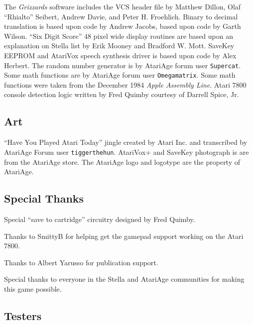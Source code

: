 \documentclass[9pt,twocolumn,openany,article]{memoir}
\begin{document}
{ \footnotesize The \textit{Grizzards} software includes the VCS header file by
  Matthew Dillon, Olaf  ``Rhialto'' Seibert, Andrew Davie,  and Peter H.
  Froehlich. Binary to decimal translation  is based upon code by Andrew
  Jacobs, based upon code by Garth  Wilson. ``Six Digit Score'' 48 pixel
  wide display routines are based upon  an explanation on Stella list by
  Erik Mooney and Bradford W. Mott. \ifdefined\ATARIAGESAVE\else SaveKey
  EEPROM and \fi{}  AtariVox speech synthesis driver is  based upon code
  by Alex Herbert. The random number generator is by AtariAge forum user
  \texttt{Supercat}.  Some math  functions  are by  AtariAge forum  user
  \texttt{Omega\-matrix}.  Some  math  functions  were  taken  from  the
  December  1984  \textit{Apple  Assembly   Line}.  Atari  7800  console
  detection  logic written  by Fred  Quimby courtesy  of Darrell  Spice,
  Jr. }

\subsection{\small Art}

{ \footnotesize  ``Have You Played Atari  Today'' jingle created by  Atari Inc.
  and  transcribed  by  AtariAge Forum  user  \texttt{tigger\-the\-hun}.
  AtariVox+     \ifdefined\ATARIAGESAVE\else    and     SaveKey    \fi{}
  photograph\ifdefined\ATARIAGESAVE{}  is    are  \fi  from  the
  AtariAge store. \ifdefined\ATARIAGESAVE The AtariAge logo and logotype
  are the property of AtariAge. \fi }

\subsection{\small Special Thanks}

{  \footnotesize  Special  ``save  to cartridge''  circuitry  designed  by
  Fred Quimby. }

{ \footnotesize Thanks to SmittyB for helping get the gamepad support working on the
  Atari 7800. }

{ \footnotesize Thanks to Albert Yarusso for publication support. }

{ \footnotesize Special thanks to everyone in the Stella and AtariAge communities for
  making this game possible. }

\subsection{\small Testers}
\end{document}
